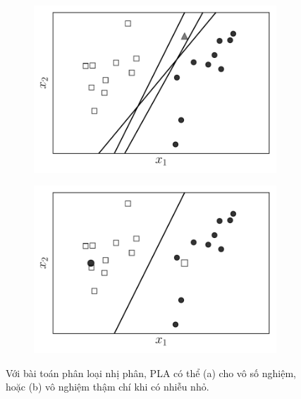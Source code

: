 \begin{figure}[t]
\begin{subfigure}{0.49\textwidth}
\includegraphics[width=0.99\linewidth]{ebookML_src/src/perceptron/pla6.pdf}
\caption{}
\label{fig:9_6a}
\end{subfigure}
\begin{subfigure}{0.49\textwidth}
\includegraphics[width=0.99\linewidth]{ebookML_src/src/perceptron/pla7.pdf}
\caption{}
\label{fig:9_6b}
\end{subfigure}
\caption{
Với bài toán phân loại nhị phân, PLA có thể (a) cho vô số nghiệm, hoặc (b) vô nghiệm thậm chí khi có nhiễu nhỏ.
}
\label{fig:9_6}
\end{figure}


